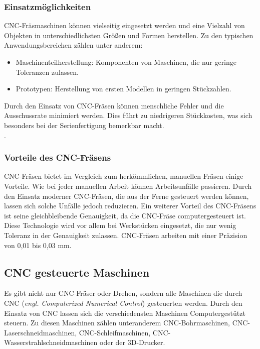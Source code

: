\subsubsection{Einsatzmöglichkeiten}
CNC-Fräsmaschinen können vielseitig eingesetzt werden und eine Vielzahl von Objekten in unterschiedlichsten Größen und Formen herstellen. Zu den typischen Anwendungsbereichen zählen unter anderem:

\begin{itemize}
	\item Maschinenteilherstellung: Komponenten von Maschinen, die nur geringe Toleranzen zulassen.
	\item Prototypen: Herstellung von ersten Modellen in geringen Stückzahlen.
\end{itemize}

Durch den Einsatz von CNC-Fräsen können menschliche Fehler und die Ausschussrate minimiert werden. Dies führt zu niedrigeren Stückkosten, was sich besonders bei der Serienfertigung bemerkbar macht.\\
 \cite{CNC-Fraesen_2} \cite{CNC-Fraesen_3}.

\subsubsection{Vorteile des CNC-Fräsens}
CNC-Fräsen bietet im Vergleich zum herkömmlichen, manuellen Fräsen einige Vorteile. Wie bei jeder manuellen Arbeit können Arbeitsunfälle passieren. Durch den Einsatz moderner CNC-Fräsen, die aus der Ferne gesteuert werden können, lassen sich solche Unfälle jedoch reduzieren. Ein weiterer Vorteil des CNC-Fräsens ist seine gleichbleibende Genauigkeit, da die CNC-Fräse computergesteuert ist. Diese Technologie wird vor allem bei Werkstücken eingesetzt, die nur wenig Toleranz in der Genauigkeit zulassen. CNC-Fräsen arbeiten mit einer Präzision von 0,01 bis 0,03 mm. \\
\cite{CNC-Fraesen_Vorteile}

\subsection{CNC gesteuerte Maschinen}
Es gibt nicht nur CNC-Fräser oder Drehen, sondern alle Maschinen die durch CNC (\emph{engl. Computerized Numerical Control}) gesteuerten werden. Durch den Einsatz von CNC lassen sich die verschiedensten Maschinen Computergestützt steuern. Zu diesen Maschinen zählen unteranderem CNC-Bohrmaschinen,  CNC-Laserschneidmaschinen, CNC-Schleifmaschinen, CNC-Wasserstrahlschneidmaschinen oder der 3D-Drucker. \\
\cite{Arten_CNC_Maschinen}

